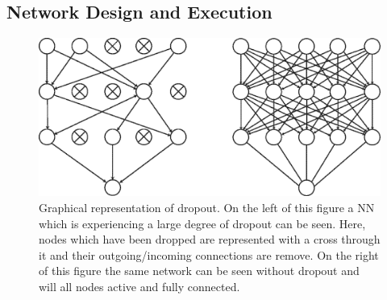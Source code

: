         \subsection{Network Design and Execution} \label{sec:pseudo_bayesian_dip_denoising_as_a_preprocessing_step_for_kinetic_modelling_in_dynamic_pet_appendix_methods_network_design_and_execution}
            \begin{figure}
                \centering
                
                \includegraphics[width=1.0\linewidth]{figures/background_dropout.png}
                
                \captionsetup{singlelinecheck=false}
                \caption{
                    Graphical representation of dropout. On the left of this figure a \gls{NN} which is experiencing a large degree of dropout can be seen. Here, nodes which have been dropped are represented with a cross through it and their outgoing/incoming connections are remove. On the right of this figure the same network can be seen without dropout and will all nodes active and fully connected.
                }
                \label{fig:pseudo_bayesian_dip_denoising_as_a_preprocessing_step_for_kinetic_modelling_in_dynamic_pet_appendix_methods_network_design_and_execution_dropout}
            \end{figure}
            
